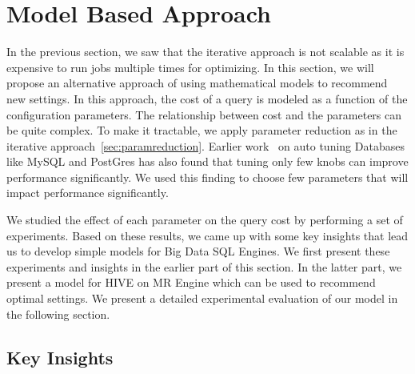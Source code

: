 \section{Model Based Approach}

In the previous section, we saw that the iterative approach is not scalable as it is expensive to run jobs multiple times for optimizing. In this section, we will propose an alternative approach of using mathematical models to recommend new settings. In this approach, the cost of a query is modeled as a function of the configuration parameters. The relationship between cost and the parameters can be quite complex. To make it tractable, we apply parameter reduction as in the iterative approach~\ref{sec:paramreduction}. Earlier work~\cite{VanKen} on auto tuning Databases like MySQL and PostGres has also found that tuning only few knobs can improve performance significantly. We used this finding to choose few parameters that will impact performance significantly. 

We studied the effect of each parameter on the query cost by performing a set of experiments. Based on these results, we came up with some key insights that lead us to develop simple models for Big Data SQL Engines. We first present these experiments and insights in the earlier part of this section. In the latter part, we present a model for HIVE on MR Engine which can be used to recommend optimal settings. We present a detailed experimental evaluation of our model in the following section.

\subsection{Key Insights}

